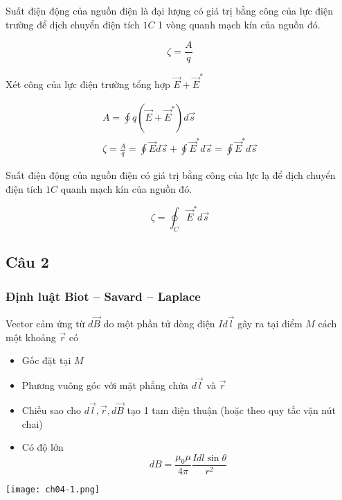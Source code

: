 Suất điện động của nguồn điện là đại lượng có giá trị bằng công của lực điện trường để dịch chuyển điện tích $1C$ 1 vòng quanh mạch kín của nguồn đó.

\begin{equation*}
  \zeta = \frac{A}{q}
\end{equation*}

Xét công của lực điện trường tổng hợp $\vec{E} + \vec{E}^*$

\begin{gather*}
  A = \oint q(\vec{E} + \vec{E}^*) d\vec{s} \\
  \zeta = \frac{A}{q} = \oint \vec{E}d\vec{s} + \oint \vec{E}^*d\vec{s} = \oint \vec{E}^*d\vec{s}
\end{gather*}

Suất điện động của nguồn điện có giá trị bằng công của lực lạ để dịch chuyển điện tích $1C$ quanh mạch kín của nguồn đó.

\begin{equation*}
  \zeta = \oint_C \vec{E}^*d\vec{s}
\end{equation*}

\newpage

\subsection{Câu 2}

\subsubsection{Định luật Biot -- Savard -- Laplace}

Vector cảm ứng từ $d\vec{B}$ do một phần tử dòng điện $Id\vec{l}$ gây ra tại điểm $M$ cách một khoảng $\vec{r}$ có

\begin{itemize}
  \item Gốc đặt tại $M$
  \item Phương vuông góc với mặt phẳng chứa $d\vec{l}$ và $\vec{r}$
  \item Chiều sao cho $d\vec{l}, \vec{r}, d\vec{B}$ tạo 1 tam diện thuận (hoặc theo quy tắc vặn nút chai)
  \item Có độ lớn 
  \begin{equation*}
    dB = \frac{\mu_0\mu}{4\pi} \frac{Idl\sin\theta}{r^2}
  \end{equation*}
\end{itemize}

\begin{figure*}[h]
  \centering
  \texttt{[image: ch04-1.png]}
\end{figure*}

